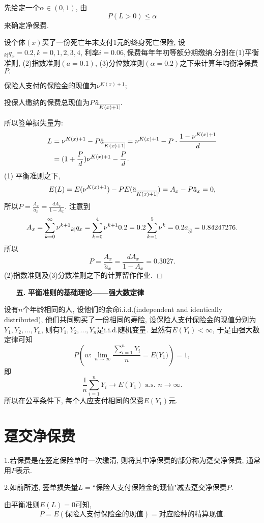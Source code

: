 \documentclass[a4paper,openany, 10pt]{ctexbook}
\makeatletter
\newcommand{\hei}{\CJKfamily{hei}}      %
\def\qed{\hfill$\Box$\medskip}
\def\z{\left}
\def\y{\right}
\DeclareRobustCommand{\annu}[1]{_{%
    \def\arraystretch{0}%
    \setlength\arraycolsep{1pt}%
    \setlength\arrayrulewidth{.2pt}%
    \begin{array}[b]{@{}c|}\hline
        \\[\arraycolsep]%
        \scriptstyle #1%
    \end{array}%
}}
\makeatother
\begin{document}
先给定一个$\alpha\in (0,1)$, 由$$P(L>0)\leqslant\alpha$$来确定净保费.

\begin{example}\label{e4.1}
   设个体$(x)$买了一份死亡年末支付1元的终身死亡保险, 设$_{k| }q_x=0.2,k=0,1,2,3,4$, 利率$i=0.06,$保费每年年初等额分期缴纳.分别在(1)平衡准则, (2)指数准则$(a=0.1)$, (3)分位数准则$(\alpha=0.2)$之下来计算年均衡净保费$P.$
\end{example}
\solution 保险人支付的保险金的现值为$\nu^{K(x)+1};$

投保人缴纳的保费总现值为$P\ddot a_{\annu {K(x)+1}}.$

所以签单损失量为:
\begin{align*}
    L & =\nu^{K(x)+1}-P\ddot a_{\annu {K(x)+1}}=\nu^{K(x)+1}-P\cdot\frac{1-\nu^{K(x)+1}}{d} \\
        & =(1+\frac{P}{d})\nu^{K(x)+1}-\frac{P}{d}. \\
\end{align*}
(1) 平衡准则之下,
$$E(L)=E(\nu^{K(x)+1})-PE(\ddot a_{\annu {K(x)+1}})=A_x-P\ddot a_{x}=0,$$
所以$P=\frac{A_x}{\ddot a_{x}}=\frac{dA_x}{1-A_x}.$
注意到$$
    A_x  =\sum_{k=0}^{\infty }{\nu^{k+1}{}_{k|}q_x}=\sum_{k=0}^4{\nu^{k+1}0.2}=0.2\sum_{k=1}^{5}{\nu^k}=0.2a_{\annu 5}=0.84247276.
$$
所以$$P=\frac{A_x}{\ddot a_{x}}=\frac{dA_x}{1-A_x}=0.3027.$$
(2)指数准则及(3)分数准则之下的计算留作作业. \qed

\begin{itemize}
    \item[{\bf\hei 五.}]{\bf\hei 平衡准则的基础理论——强大数定律}
\end{itemize}

设有$n$个年龄相同的人, 设他们的余命i.i.d.(independent and identically distributed), 他们共同购买了一份相同的寿险, 设保险人支付保险金的现值分别为$Y_1,Y_2,...,Y_n$, 则有$Y_1,Y_2,...,Y_n$是i.i.d.随机变量. 显然有$E(Y_i)<\infty$, 于是由强大数定律可知
$$P\z({w:\underset{n\rightarrow \infty}{\lim}\frac{\sum_{i=1}^{n}{Y_i}}{n}=E(Y_1})\y)=1,$$ 即
$$\frac{1}{n}\sum_{i=1}^n{Y_i}\rightarrow E(Y_1)\text{ a.s. }n\rightarrow\infty.$$
所以在公平条件下, 每个人应支付相同的保费$E(Y_1)$元.
\section{趸交净保费}
1.若保费是在签定保险单时一次缴清, 则将其中净保费的部分称为趸交净保费, 通常用$P$表示.

2.如前所述, 签单损失量$L=$``保险人支付保险金的现值"减去趸交净保费$P.$

由平衡准则$E(L)=0$可知, $$P=E(\text{保险人支付保险金的现值})=\text{对应险种的精算现值}.$$
\end{document}
